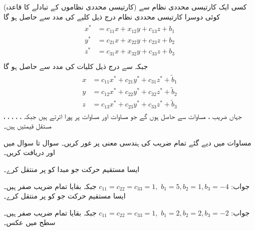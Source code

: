 \quad (کارتیسی محددی نظاموں کے تبادلے کا قاعدہ)
کسی ایک کارتیسی محددی نظام  سے کوئی دوسرا کارتیسی محددی نظام   درج ذیل کلیے کی مدد سے حاصل ہو گا
\begin{gather}
\begin{aligned}\label{مساوات_الاحصاء_عمومی_مستوی_تبادل_الف}
x^*&=c_{11}x+x_{12}y+c_{13}z+b_1\\
y^*&=c_{21}x+x_{22}y+c_{23}z+b_2\\
z^*&=c_{31}x+x_{32}y+c_{33}z+b_3\\
\end{aligned}
\end{gather}
جبکہ  سے  درج ذیل کلیات کی مدد سے حاصل ہو گا
\begin{gather}
\begin{aligned}\label{مساوات_الاحصاء_عمومی_مستوی_تبادل_ب}
x&=c_{11}x^*+c_{21}y^*+c_{31}z^*+\tilde{b}_1\\
y&=c_{12}x^*+c_{22}y^*+c_{32}z^*+\tilde{b}_2\\
z&=c_{13}x^*+c_{23}y^*+c_{33}z^*+\tilde{b}_3
\end{aligned}
\end{gather}
جہاں  ضریب  ،  مساوات  سے حاصل ہوں گے جو مساوات  اور مساوات  پر پورا اترتے ہیں جبکہ ، ، ، ، ،  مستقل قیمتیں ہیں۔


مساوات  میں دیے گئے تمام  ضریب  کی ہندسی  معنی پر غور کریں۔
سوال  تا سوال  میں  اور  دریافت کریں۔

ایسا مستقیم حرکت جو مبدا کو  پر منتقل کرے۔

جواب:
$c_{11}=c_{22}=c_{33}=1, \,\,b_1=5, b_2=1, b_3=-4$
جبکہ بقایا تمام  ضریب  صفر ہیں۔
ایسا مستقیم حرکت جو  کو  پر منتقل کرے۔

جواب:
$c_{11}=c_{22}=c_{33}=1, \,\,b_1=2, b_2=2, b_3=-2$
جبکہ بقایا تمام  ضریب  صفر ہیں۔
سطح  میں عکس۔

